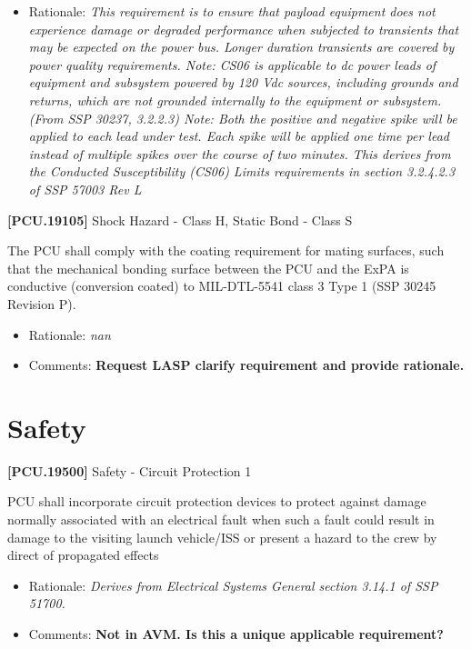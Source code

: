 \begin{itemize}
\item{} Rationale: \emph{This requirement is to ensure that payload equipment does not experience damage or degraded performance when subjected to transients that may be expected on the power bus. Longer duration transients are covered by power quality requirements. Note: CS06 is applicable to dc power leads of equipment and subsystem powered by 120 Vdc sources, including grounds and returns, which are not grounded internally to the equipment or subsystem. (From SSP 30237, 3.2.2.3) Note: Both the positive and negative spike will be applied to each lead under test. Each spike will be applied one time per lead instead of multiple spikes over the course of two minutes. This derives from the Conducted Susceptibility (CS06) Limits requirements in section 3.2.4.2.3 of SSP 57003 Rev L}

\end{itemize}

\textbf{[PCU.19105]} Shock Hazard - Class H, Static Bond - Class S

The \gls{PCU} shall comply with the coating requirement for mating surfaces, such that the mechanical bonding surface between the \gls{PCU} and the \gls{ExPA} is conductive (conversion coated) to MIL-DTL-5541 class 3 Type 1 (SSP 30245 Revision P).

\begin{itemize}
\item{} Rationale: \emph{nan}

\item{} Comments: \textbf{Request LASP clarify requirement and provide rationale.}

\end{itemize}

\section{Safety}
\label{safety}

\textbf{[PCU.19500]} Safety - Circuit Protection 1

\gls{PCU} shall incorporate circuit protection devices to protect against damage normally associated with an electrical fault when such a fault could result in damage to the visiting launch vehicle\slash \gls{ISS} or present a hazard to the crew by direct of propagated effects

\begin{itemize}
\item{} Rationale: \emph{Derives from Electrical Systems General section 3.14.1 of SSP 51700.}

\item{} Comments: \textbf{Not in AVM. Is this a unique applicable requirement?}

\end{itemize}


